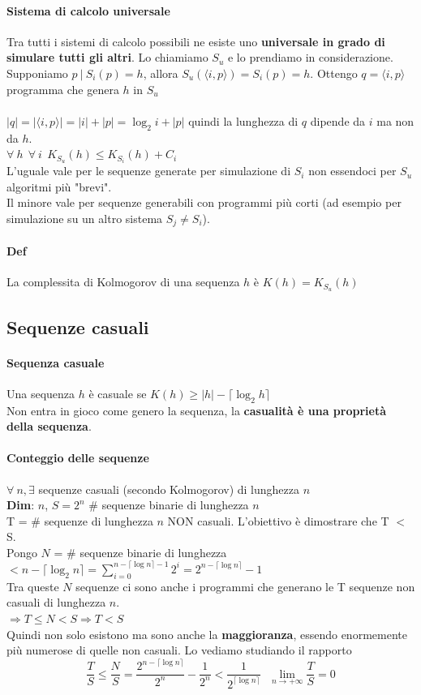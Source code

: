 \documentclass[10pt]{book}
\begin{document}
\paragraph{Sistema di calcolo universale} Tra tutti i sistemi di calcolo possibili ne esiste uno \textbf{universale in grado di simulare tutti gli altri}. Lo chiamiamo $S_u$ e lo prendiamo in considerazione.\\
Supponiamo $p\:|\:S_i(p) = h$, allora $S_u(\langle i, p\rangle) = S_i(p) = h$. Ottengo $q = \langle i, p\rangle$ programma che genera $h$ in $S_u$\\\\
$|q| = |\langle i,p\rangle| = |i| + |p| = \log_2 i + |p|$ quindi la lunghezza di $q$ dipende da $i$ ma non da $h$.\\
$\forall\:h\:\:\forall\: i\:\:K_{S_u}(h) \leq K_{S_i}(h) + C_i$\\
L'uguale vale per le sequenze generate per simulazione di $S_i$ non essendoci per $S_u$ algoritmi più "brevi".\\Il minore vale per sequenze generabili con programmi più corti (ad esempio per simulazione su un altro sistema $S_j\neq S_i$).
\paragraph{Def} La complessita di Kolmogorov di una sequenza $h$ è $K(h) = K_{S_u}(h)$
\subsection{Sequenze casuali}
\paragraph{Sequenza casuale} Una sequenza $h$ è casuale se $K(h) \geq |h| - \lceil\log_2 h\rceil$\\
Non entra in gioco come genero la sequenza, la \textbf{casualità è una proprietà della sequenza}.
\paragraph{Conteggio delle sequenze} $\forall\: n, \exists$ sequenze casuali (secondo Kolmogorov) di lunghezza $n$\\
\textbf{Dim}: $n$, $S = 2^n$ \# sequenze binarie di lunghezza $n$\\
T = \# sequenze di lunghezza $n$ NON casuali. L'obiettivo è dimostrare che T $<$ S.\\
Pongo $N$ = \# sequenze binarie di lunghezza $< n - \lceil \log_2 n\rceil = \sum_{i=0}^{n-\lceil \log n\rceil - 1} 2^i = 2^{n-\lceil \log n\rceil} - 1$\\
Tra queste $N$ sequenze ci sono anche i programmi che generano le T sequenze non casuali di lunghezza $n$.\\
$\Rightarrow T\leq N < S \Rightarrow T < S$\\
Quindi non solo esistono ma sono anche la \textbf{maggioranza}, essendo enormemente più numerose di quelle non casuali. Lo vediamo studiando il rapporto $$\frac{T}{S}\leq \frac{N}{S} = \frac{2^{n - \lceil\log n\rceil}}{2^n} - \frac{1}{2^n} < \frac{1}{2^{\lceil\log n\rceil}}\:\:\:\lim_{n\to +\infty} \frac{T}{S} = 0$$
\end{document}
